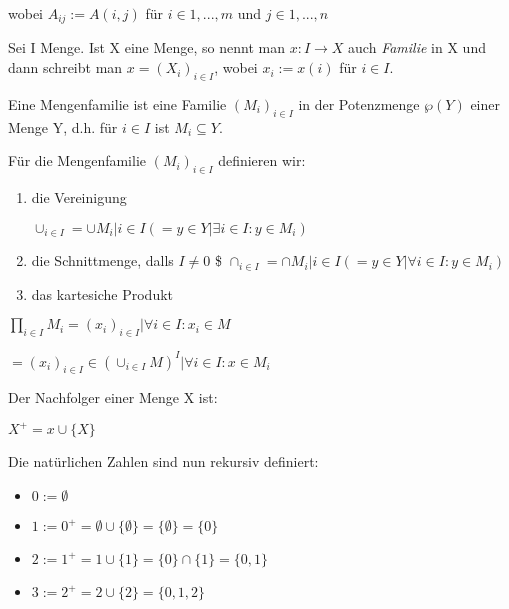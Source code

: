\documentclass{../../meta/tudscript}
\begin{document}
wobei \(A_{ij} := A(i,j)\) für \(i \in {1,...,m}\) und \( j \in {1,...,n}\)


Sei I Menge. Ist X eine Menge, so nennt man \(x: I \rightarrow X\) auch
\emph{Familie} in X und dann schreibt man \(x = (X_i)_{i \in I}\), wobei
\(x_i := x(i)\) für \(i \in I\).

Eine Mengenfamilie ist eine Familie \((M_i)_{i \in I}\) in der
Potenzmenge \(\wp(Y)\) einer Menge Y, d.h. für \(i \in I\) ist
\(M_i \subseteq Y\).

Für die Mengenfamilie \((M_i)_{i \in I}\) definieren wir:

\begin{enumerate}

\item
  die Vereinigung


\(\cup_{i \in I} = \cup {M_i | i \in I} (= {y \in Y| \exists i \in I: y \in M_i})\)


\item
  die Schnittmenge, dalls \(I \neq 0\) \$
  \(\cap_{i \in I} = \cap {M_i | i \in I} (= {y \in Y | \forall i \in I: y \in M_i})\)
\item
  das kartesiche Produkt
\end{enumerate}

\(\prod_{i \in I} M_i = {(x_i)_{i \in I} | \forall i \in I: x_i \in M}\)

\(= {(x_i)_{i \in I} \in (\cup_{i \in I} M)^I | \forall i \in I: x \in M_i}\)



Der Nachfolger einer Menge X ist:

\(X^+ = x \cup \{X\}\)

Die natürlichen Zahlen sind nun rekursiv definiert:

\begin{itemize}

\item
  \(0 := \emptyset\)
\item
  \(1 := 0^+ = \emptyset \cup \{\emptyset\} = \{\emptyset\} = \{0\}\)
\item
  \(2 := 1^+ = 1 \cup \{1\} = \{0\} \cap \{1\} = \{0,1\}\)
\item
  \(3 := 2^+ = 2 \cup \{2\} = \{0,1,2\}\)
\end{itemize}
\end{document}
